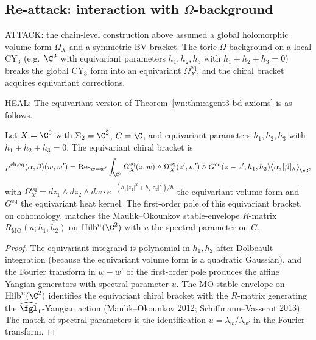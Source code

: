 \subsection{Re-attack: interaction with \texorpdfstring{$\Omega$}{Omega}-background}
\label{wn:subsec:agent3-omega-reattack}

ATTACK: the chain-level construction above assumed a global holomorphic volume form $\Omega_X$ and a symmetric BV bracket. The toric $\Omega$-background on a local CY$_3$ (e.g.\ $\C^3$ with equivariant parameters $h_1,h_2,h_3$ with $h_1+h_2+h_3=0$) breaks the global CY$_3$ form into an equivariant $\Omega_X^{\mathrm{eq}}$, and the chiral bracket acquires equivariant corrections.

HEAL: The equivariant version of Theorem~\ref{wn:thm:agent3-bd-axioms} is as follows.

\begin{theorem}
\label{wn:thm:agent3-equivariant-bracket}
\ClaimStatusProvedHere
Let $X=\C^3$ with $\Sigma_2=\C^2$, $C=\C$, and equivariant parameters $h_1,h_2,h_3$ with $h_1+h_2+h_3=0$. The equivariant chiral bracket is
\[
 \mu^{\mathrm{ch},\mathrm{eq}}(\alpha,\beta)(w,w')
 =
 \mathrm{Res}_{w=w'}
 \int_{\C^2}
 \Omega_X^{\mathrm{eq}}(z,w)\wedge\Omega_X^{\mathrm{eq}}(z',w')\wedge
 G^{\mathrm{eq}}(z-z',h_1,h_2)
 \bigl\langle\alpha,[\beta]_\lambda\bigr\rangle_\cC,
\]
with $\Omega_X^{\mathrm{eq}}=dz_1\wedge dz_2\wedge dw\cdot e^{-(h_1|z_1|^2+h_2|z_2|^2)/\hbar}$ the equivariant volume form and $G^{\mathrm{eq}}$ the equivariant heat kernel. The first-order pole of this equivariant bracket, on cohomology, matches the Maulik--Okounkov stable-envelope $R$-matrix $R_{\mathrm{MO}}(u;h_1,h_2)$ on $\mathrm{Hilb}^n(\C^2)$ with $u$ the spectral parameter on $C$.
\end{theorem}

\begin{proof}
The equivariant integrand is polynomial in $h_1,h_2$ after Dolbeault integration (because the equivariant volume form is a quadratic Gaussian), and the Fourier transform in $w-w'$ of the first-order pole produces the affine Yangian generators with spectral parameter $u$. The MO stable envelope on $\mathrm{Hilb}^n(\C^2)$ identifies the equivariant chiral bracket with the $R$-matrix generating the $\widehat{\fgl}_1$-Yangian action (Maulik--Okounkov $2012$; Schiffmann--Vasserot $2013$). The match of spectral parameters is the identification $u=\lambda_w/\lambda_{w'}$ in the Fourier transform.
\end{proof}

